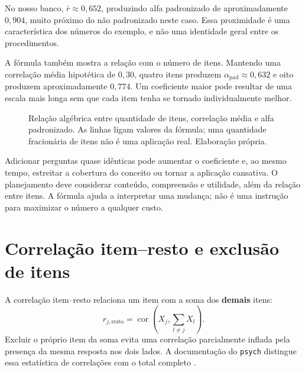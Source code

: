 No nosso banco, $\bar r\approx0{,}652$, produzindo alfa padronizado de aproximadamente $0{,}904$, muito próximo do não padronizado neste caso. Essa proximidade é uma característica dos números do exemplo, e não uma identidade geral entre os procedimentos.

A fórmula também mostra a relação com o número de itens. Mantendo uma correlação média hipotética de $0{,}30$, quatro itens produzem $\alpha_{\mathrm{pad}}\approx0{,}632$ e oito produzem aproximadamente $0{,}774$. Um coeficiente maior pode resultar de uma escala mais longa sem que cada item tenha se tornado individualmente melhor.

\begin{figure}[H]
\centering
{}
\caption{Relação algébrica entre quantidade de itens, correlação média e alfa padronizado. As linhas ligam valores da fórmula; uma quantidade fracionária de itens não é uma aplicação real. Elaboração própria.}
\label{fig:alpha-comprimento}
\end{figure}

Adicionar perguntas quase idênticas pode aumentar o coeficiente e, ao mesmo tempo, estreitar a cobertura do conceito ou tornar a aplicação cansativa. O planejamento deve considerar conteúdo, compreensão e utilidade, além da relação entre itens. A fórmula ajuda a interpretar uma mudança; não é uma instrução para maximizar o número a qualquer custo.

\section{Correlação item--resto e exclusão de itens}

A correlação item--resto relaciona um item com a soma dos \textbf{demais} itens:
\[
r_{j,\mathrm{resto}}=
\operatorname{cor}\left(X_j,\sum_{l\ne j}X_l\right).
\]
Excluir o próprio item da soma evita uma correlação parcialmente inflada pela presença da mesma resposta nos dois lados. A documentação do \texttt{psych} distingue essa estatística de correlações com o total completo \parencite{RevelleAlpha}.

